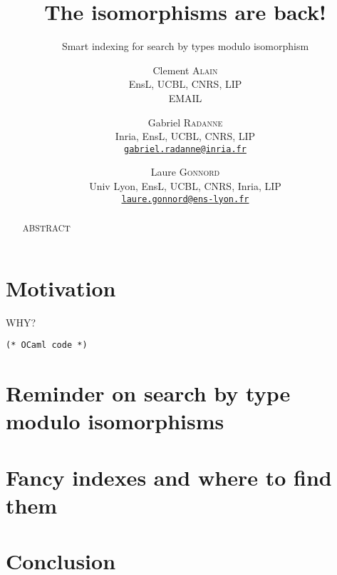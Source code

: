 \documentclass[a4paper,11pt]{scrartcl}
\title{The isomorphisms are back!}
\subtitle{Smart indexing for search by types modulo isomorphism}
\author{
  Clement \textsc{Alain}\\
  EnsL, UCBL, CNRS, LIP\\
  EMAIL
  \and
  \and
  Gabriel \textsc{Radanne}\\
  Inria, EnsL, UCBL, CNRS, LIP\\
  \href{mailto:gabriel.radanne@inria.fr}
  {\nolinkurl{gabriel.radanne@inria.fr}}
  \and
  Laure \textsc{Gonnord}\\
  Univ Lyon, EnsL, UCBL, CNRS, Inria, LIP\\
  \href{mailto:laure.gonnord@ens-lyon.fr}
  {\nolinkurl{laure.gonnord@ens-lyon.fr}}
}
\date{}
\begin{document}
\maketitle

\begin{abstract}
ABSTRACT
\end{abstract}

\section{Motivation}

WHY?

\begin{verbatim}
(* OCaml code *)
\end{verbatim}

\section{Reminder on search by type modulo isomorphisms}

\section{Fancy indexes and where to find them}

\section{Conclusion}

\printbibliography
\end{document}
